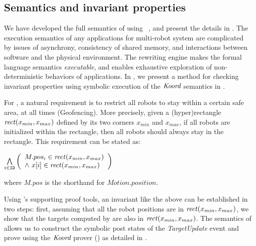 \subsection{Semantics and invariant properties}

We have developed the full semantics of \lgname using \K~\cite{rosu-serbanuta-2013-k}, and present the details in .
The execution semantics of any applications for multi-robot system are complicated by issues of asynchrony,
consistency of shared memory, and interactions between software and the physical environment.
The \K rewriting engine makes the formal language semantics \emph{executable},
and enables exhaustive exploration of non-deterministic behaviors of \lgname applications.
In , we present a method for checking invariant properties using symbolic execution of the $\emph{Koord}$ semantics in \K.

For \LineForm, a natural requirement is to restrict all robots to stay within a certain safe area, at all times (Geofencing).
More precisely, given a (hyper)rectangle $\mathit{rect}(x_{min}, x_{max})$ defined by its two corners $x_{min}$ and $x_{max}$,
if all robots are initialized within the rectangle, then all robots should always stay in the rectangle.
This requirement can be stated as:
\begin{invariant}
\label{inv:lineform}
\(
\bigwedge\limits_{i \in \texttt{ID}}
    \left(
    \begin{array}{l}
        M.pos_{i} \in \mathit{rect}(x_{min}, x_{max}) \\
        \land\ x[i] \in \mathit{rect}(x_{min}, x_{max})
    \end{array}
    \right)
\)
\end{invariant}
\noindent
where $M.pos$ is the shorthand for $Motion.position$.

Using \lgname's supporting proof tools, an invariant like the above can be established in two steps:
first, assuming that all the robot positions are in $\mathit{rect}(x_{min}, x_{max})$,
we show that the targets computed by \LineForm are also in $\mathit{rect}(x_{min}, x_{max})$.
The \K semantics of \lgname allows us to construct the symbolic post states of the \emph{TargetUpdate} event
and prove  using the $\emph{Koord}$ prover () as detailed in .

